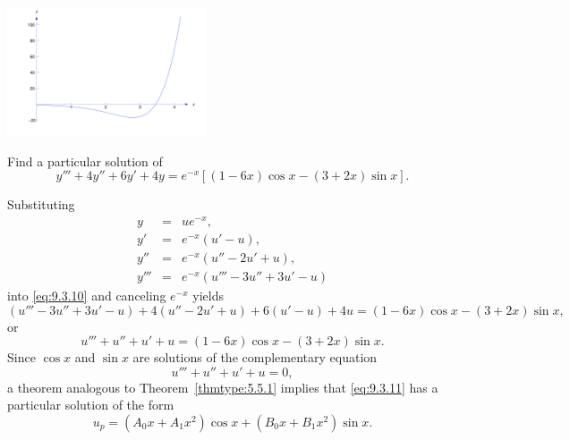 \documentclass{ximera}
\begin{document}
\begin{example}
\begin{explanation}
\begin{image}
 \includegraphics[height=1.5in]{fig090303.jpg} 
\end{image}

     
\end{explanation}
\end{example}




\begin{example}\label{example:9.3.4}
Find a particular solution of
\begin{equation} \label{eq:9.3.10}
 y'''+4y''+6y'+4y=
e^{-x}\left[(1-6x)\cos x-(3+2x)\sin x\right].
\end{equation}

\begin{explanation} 
Substituting
\begin{eqnarray*}
y&=&ue^{-x},\\ y'&=&e^{-x}(u'-u),\\
y''&=&e^{-x}(u''-2u'+u),\\
y'''&=&e^{-x}(u'''-3u''+3u'-u)
\end{eqnarray*}
into \eqref{eq:9.3.10} and canceling $e^{-x}$ yields
$$
(u'''-3u''+3u'-u)+4(u''-2u'+u)+6(u'-u)+4u
=(1-6x)\cos x-(3+2x)\sin x,
$$
or
\begin{equation} \label{eq:9.3.11}
u'''+u''+u'+u=(1-6x)\cos x-(3+2x)\sin x.
\end{equation}
Since $\cos x$ and $\sin x$ are  solutions of the complementary
equation
$$
u'''+u''+u'+u=0,
$$
a theorem analogous to Theorem~\ref{thmtype:5.5.1} implies
that  \eqref{eq:9.3.11} has a particular solution of the form
\begin{equation} \label{eq:9.3.12}
u_p=(A_0x+A_1x^2)\cos x+(B_0x+B_1x^2)\sin x.
\end{equation}


\end{explanation}
\end{example}
\end{document}
